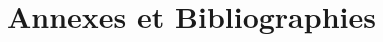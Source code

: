 





%


%
%


\appendix


\part*{Annexes et Bibliographies} %

%


%
%


\label{app:bibliography} %

